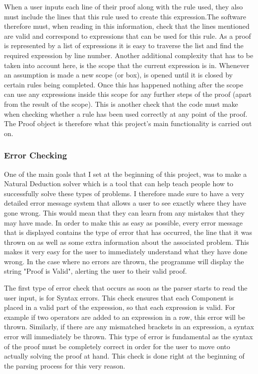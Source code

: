 When a user inputs each line of their proof along with the rule used, they also must include the lines that this rule used to create this expression.The software therefore must, when reading in this information, check that the lines mentioned are valid and correspond to expressions that can be used for this rule. As a proof is represented by a list of expressions it is easy to traverse the list and find the required expression by line number. Another additional complexity that has to be taken into account here, is the scope that the current expression is in. Whenever an assumption is made a new scope (or box), is opened until it is closed by certain rules being completed. Once this has happened nothing after the scope can use any expressions inside this scope for any further steps of the proof (apart from the result of the scope). This is another check that the code must make when checking whether a rule has been used correctly at any point of the proof. The Proof object is therefore what this project's main functionality is carried out on.

\subsubsection{Error Checking}

One of the main goals that I set at the beginning of this project, was to make a Natural Deduction solver which is a tool that can help teach people how to successfully solve these types of problems. I therefore made sure to have a very detailed error message system that allows a user to see exactly where they have gone wrong. This would mean that they can learn from any mistakes that they may have made. In order to make this as easy as possible, every error message that is displayed contains the type of error that has occurred, the line that it was thrown on as well as some extra information about the associated problem. This makes it very easy for the user to immediately understand what they have done wrong. In the case where no errors are thrown, the programme will display the string "Proof is Valid", alerting the user to their valid proof. 

The first type of error check that occurs as soon as the parser starts to read the user input, is for Syntax errors. This check ensures that each Component is placed in a valid part of the expression, so that each expression is valid. For example if two operators are added to an expression in a row, this error will be thrown. Similarly, if there are any mismatched brackets in an expression, a syntax error will immediately be thrown. This type of error is fundamental as the syntax of the proof must be completely correct in order for the user to move onto actually solving the proof at hand. This check is done right at the beginning of the parsing process for this very reason.

